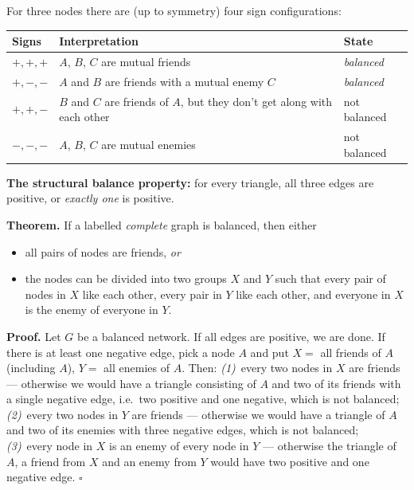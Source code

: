 \documentclass[11pt,a4paper]{article}
\theoremstyle{definition}
\begin{document}
\begin{defbox}
For three nodes there are (up to symmetry) four sign configurations:
\begin{center}
\small
\begin{tabular}{@{}p{3.0cm}p{9.5cm}p{2.4cm}@{}}
\toprule
\textbf{Signs} & \textbf{Interpretation} & \textbf{State} \\
\midrule
$+,+,+$ & $A$, $B$, $C$ are mutual friends & \emph{balanced} \\
$+,-,-$ & $A$ and $B$ are friends with a mutual enemy $C$ & \emph{balanced} \\
$+,+,-$ & $B$ and $C$ are friends of $A$, but they don't get along with each other & not balanced \\
$-,-,-$ & $A$, $B$, $C$ are mutual enemies & not balanced \\
\bottomrule
\end{tabular}
\end{center}
\textbf{The structural balance property:} for every triangle, all three edges are positive, or
\emph{exactly one} is positive.
\end{defbox}

\begin{defbox}
\textbf{Theorem.} If a labelled \emph{complete} graph is balanced, then either
\begin{itemize}
\item all pairs of nodes are friends, \emph{or}
\item the nodes can be divided into two groups $X$ and $Y$ such that every pair of nodes in $X$ like
      each other, every pair in $Y$ like each other, and everyone in $X$ is the enemy of everyone in
      $Y$.
\end{itemize}

\textbf{Proof.} Let $G$ be a balanced network. If all edges are positive, we are done. If there is at
least one negative edge, pick a node $A$ and put $X=$ all friends of $A$ (including $A$), $Y=$ all
enemies of $A$. Then: \emph{(1)}~every two nodes in $X$ are friends --- otherwise we would have a
triangle consisting of $A$ and two of its friends with a single negative edge, i.e.\ two positive and
one negative, which is not balanced; \emph{(2)}~every two nodes in $Y$ are friends --- otherwise we
would have a triangle of $A$ and two of its enemies with three negative edges, which is not balanced;
\emph{(3)}~every node in $X$ is an enemy of every node in $Y$ --- otherwise the triangle of $A$, a
friend from $X$ and an enemy from $Y$ would have two positive and one negative edge. $\square$
\end{defbox}
\end{document}
